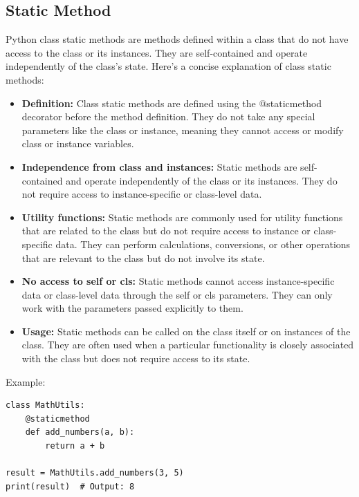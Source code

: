 \documentclass{report}
\begin{document}
    \pagebreak \bigbreak \noindent
    \subsection{Static Method}
    \bigbreak \noindent 
    Python class static methods are methods defined within a class that do not have access to the class or its instances. They are self-contained and operate independently of the class's state. Here's a concise explanation of class static methods:
    \begin{itemize}
        \item \textbf{Definition:} Class static methods are defined using the @staticmethod decorator before the method definition. They do not take any special parameters like the class or instance, meaning they cannot access or modify class or instance variables.
        \item \textbf{Independence from class and instances:} Static methods are self-contained and operate independently of the class or its instances. They do not require access to instance-specific or class-level data.
        \item \textbf{Utility functions:} Static methods are commonly used for utility functions that are related to the class but do not require access to instance or class-specific data. They can perform calculations, conversions, or other operations that are relevant to the class but do not involve its state.
        \item \textbf{No access to self or cls:} Static methods cannot access instance-specific data or class-level data through the self or cls parameters. They can only work with the parameters passed explicitly to them.
        \item \textbf{Usage:} Static methods can be called on the class itself or on instances of the class. They are often used when a particular functionality is closely associated with the class but does not require access to its state.
    \end{itemize}
    Example:
    \begin{verbatim}
class MathUtils:
    @staticmethod
    def add_numbers(a, b):
        return a + b

result = MathUtils.add_numbers(3, 5)
print(result)  # Output: 8
        
    \end{verbatim}
    

    \pagebreak \bigbreak \noindent
\end{document}
